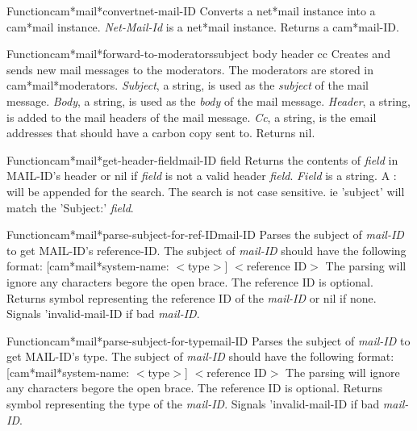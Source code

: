 \begin{functiondoc}{Function}{cam*mail*convert}{net-mail-ID}
Converts a net*mail instance into a cam*mail instance.
{\em Net-Mail-Id} is a net*mail instance.
Returns a cam*mail-ID.
\end{functiondoc}

\begin{functiondoc}{Function}{cam*mail*forward-to-moderators}{subject body header cc}
Creates and sends new mail messages to the moderators.  The moderators are
stored in cam*mail*moderators.  
{\em Subject}, a string, is used as the {\em subject} of the mail message.
{\em Body}, a string, is used as the {\em body} of the mail message.
{\em Header}, a string, is added to the mail headers of the mail message.
{\em Cc}, a string, is the email addresses that should have a carbon copy sent to.
Returns nil.
\end{functiondoc}

\begin{functiondoc}{Function}{cam*mail*get-header-field}{mail-ID field}
Returns the contents of {\em field} in MAIL-ID's header or nil if {\em field} is not a valid
header {\em field}.
{\em Field} is a string.  A : will be appended for the search.  The search is not
case sensitive.  ie 'subject' will match the 'Subject:' {\em field}.
\end{functiondoc}

\begin{functiondoc}{Function}{cam*mail*parse-subject-for-ref-ID}{mail-ID}
Parses the subject of {\em mail-ID} to get MAIL-ID's reference-ID.
The subject of {\em mail-ID} should have the following format:
[cam*mail*system-name: $<$type$>$] $<$reference ID$>$
The parsing will ignore any characters begore the open brace.
The reference ID is optional.
Returns symbol representing the reference ID of the {\em mail-ID} or nil if none.
Signals 'invalid-mail-ID if bad {\em mail-ID}.
\end{functiondoc}

\begin{functiondoc}{Function}{cam*mail*parse-subject-for-type}{mail-ID}
Parses the subject of {\em mail-ID} to get MAIL-ID's type.
The subject of {\em mail-ID} should have the following format:
[cam*mail*system-name: $<$type$>$] $<$reference ID$>$
The parsing will ignore any characters begore the open brace.
The reference ID is optional.
Returns symbol representing the type of the {\em mail-ID}.
Signals 'invalid-mail-ID if bad {\em mail-ID}.
\end{functiondoc}

